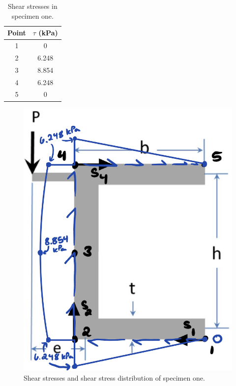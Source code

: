 \documentclass[12 pt]{report}
\begin{document}
\begin{table}[!htbp]
\caption{Shear stresses in specimen one.}
\begin{center}
	\begin{tabular}{|c|c|}
		\hline
		Point&$\tau$ (\unit{\kilo\pascal})\\
		\hline
		\num{1}&\num{0}\\
		\hline
		\num{2}&\num{6.248}\\
		\hline
		\num{3}&\num{8.854}\\
		\hline
		\num{4}&\num{6.248}\\
		\hline
		\num{5}&\num{0}\\
		\hline
	\end{tabular}
\end{center}
\label{tbl:shear_stresses_1}
\end{table}

\begin{figure}[htbp]
	\centering
	\includegraphics[width=5in]{images/shear_stresses_1}
	\caption{Shear stresses and shear stress distribution of specimen one.}
	\label{fig:shear_stresses_1}
\end{figure}
\end{document}
